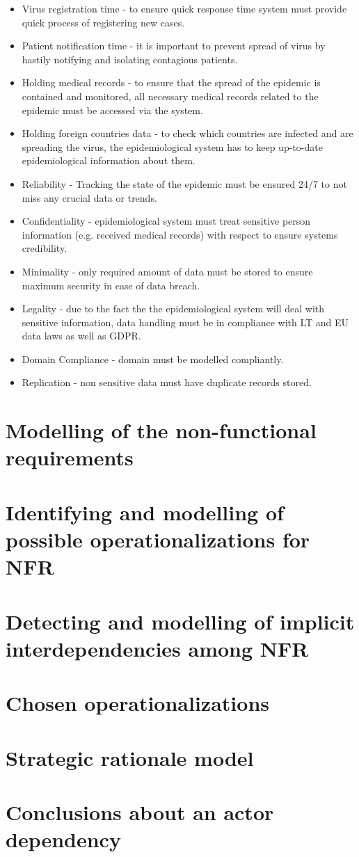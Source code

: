 \documentclass{VUMIFPSkursinis}
\begin{document}
	\begin{itemize}
		\item{Virus registration time - to ensure quick response time system must provide quick process of registering new cases. }
		\item{Patient notification time - it is important to prevent spread of virus by hastily notifying and isolating contagious patients.}
		\item{Holding medical records - to ensure that the spread of the epidemic is contained and monitored, all necessary medical records related to the epidemic must be accessed via the system. }
		\item{Holding foreign countries data - to check which countries are infected and are spreading the virus, the epidemiological system has to keep up-to-date epidemiological information about them.}
		\item{Reliability - Tracking the state of the epidemic must be ensured 24/7 to not miss any crucial data or trends.}
		\item{Confidentiality - epidemiological system must treat sensitive person information (e.g. received medical records) with respect to ensure systems credibility.}
		\item{Minimality - only required amount of data must be stored to ensure maximum security in case of data breach.}
		\item {Legality - due to the fact the the epidemiological system will deal with sensitive information, data handling must be in compliance with LT and EU data laws as well as GDPR.}
		\item{Domain Compliance - domain must be modelled compliantly.}
		\item{Replication - non sensitive data must have duplicate records stored.}
	\end{itemize}

\section{Modelling of the non-functional requirements}

\section{Identifying and modelling of possible operationalizations for NFR}

\section{Detecting and modelling of implicit interdependencies among NFR}

\section{Chosen operationalizations}

\section{Strategic rationale model}

\section{Conclusions about an actor dependency}

\end{document}
